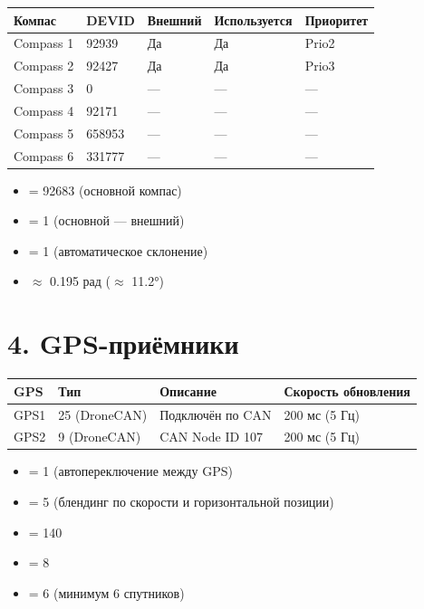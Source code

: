 \documentclass[a4paper,11pt]{article}
\begin{document}
\begin{longtable}{lllll}
  \toprule
  \textbf{Компас} & \textbf{DEVID} & \textbf{Внешний} & \textbf{Используется} & \textbf{Приоритет} \\
  \midrule
  Compass 1 & 92939  & Да & Да & Prio2 \\
  Compass 2 & 92427  & Да & Да & Prio3 \\
  Compass 3 & 0      & —  & —  & — \\
  Compass 4 & 92171  & —  & —  & — \\
  Compass 5 & 658953 & —  & —  & — \\
  Compass 6 & 331777 & —  & —  & — \\
  \bottomrule
\end{longtable}

\begin{itemize}[nosep]
  \item {} = 92683 (основной компас)
  \item {} = 1 (основной — внешний)
  \item {} = 1 (автоматическое склонение)
  \item {} $\approx$ 0.195 рад ($\approx$ 11.2°)
\end{itemize}

\section{4. GPS-приёмники}

\begin{longtable}{llll}
  \toprule
  \textbf{GPS} & \textbf{Тип} & \textbf{Описание} & \textbf{Скорость обновления} \\
  \midrule
  GPS1 & 25 (DroneCAN) & Подключён по CAN     & 200 мс (5 Гц) \\
  GPS2 & 9 (DroneCAN)  & CAN Node ID 107      & 200 мс (5 Гц) \\
  \bottomrule
\end{longtable}

\begin{itemize}[nosep]
  \item {} = 1 (автопереключение между GPS)
  \item {} = 5 (блендинг по скорости и горизонтальной позиции)
  \item {} = 140
  \item {} = 8
  \item {} = 6 (минимум 6 спутников)
\end{itemize}
\end{document}
